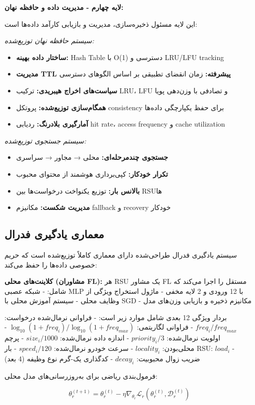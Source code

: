 \documentclass[11pt]{article}
\newcommand{\فصل}[1]{\section{#1}}
\newcommand{\قسمت}[1]{\subsection{#1}}
\begin{document}
\textbf{لایه چهارم - مدیریت داده و حافظه نهان:}

این لایه مسئول ذخیره‌سازی، مدیریت و بازیابی کارآمد داده‌ها است:

\textit{سیستم حافظه نهان توزیع‌شده:}
\begin{itemize}
\item \textbf{ساختار داده بهینه:} Hash Table با O(1) دسترسی و LRU/LFU tracking
\item \textbf{مدیریت TTL پیشرفته:} زمان انقضای تطبیقی بر اساس الگوهای دسترسی
\item \textbf{سیاست‌های اخراج هیبریدی:} ترکیب LRU، LFU و تصادفی با وزن‌دهی پویا
\item \textbf{همگام‌سازی توزیع‌شده:} پروتکل consistency برای حفظ یکپارچگی داده‌ها
\item \textbf{آمارگیری بلادرنگ:} ردیابی hit rate، access frequency و cache utilization
\end{itemize}

\textit{سیستم جستجوی توزیع‌شده:}
\begin{itemize}
\item \textbf{جستجوی چندمرحله‌ای:} محلی → مجاور → سراسری
\item \textbf{تکرار خودکار:} کپی‌برداری هوشمند از محتوای محبوب
\item \textbf{بالانس بار:} توزیع یکنواخت درخواست‌ها بین RSUها
\item \textbf{مدیریت شکست:} مکانیزم fallback و recovery خودکار
\end{itemize}

\قسمت{معماری یادگیری فدرال}

سیستم یادگیری فدرال طراحی‌شده دارای معماری کاملاً توزیع‌شده است که حریم خصوصی داده‌ها را حفظ می‌کند:

\textbf{کلاینت‌های محلی (مشاوران FL):}
هر RSU یک مشاور FL مستقل را اجرا می‌کند که شامل:
- شبکه عصبی MLP با 12 ورودی و 2 لایه مخفی
- ماژول استخراج ویژگی از وظایف محلی
- سیستم آموزش محلی با SGD
- مکانیزم ذخیره و بازیابی وزن‌های مدل

بردار ویژگی 12 بعدی شامل موارد زیر است:
- فراوانی نرمال‌شده درخواست: $freq_i / freq_{max}$
- فراوانی لگاریتمی: $\log_{10}(1 + freq_i) / \log_{10}(1 + freq_{max})$
- اولویت نرمال‌شده: $priority_i / 3$
- اندازه داده نرمال‌شده: $size_i / 1000$
- پرچم محلی‌بودن: $locality_i$
- سرعت خودرو نرمال‌شده: $speed_i / 120$
- بار RSU: $load_i$
- ضریب زوال محبوبیت: $decay_i$
- کدگذاری یک-گرم نوع وظیفه (4 بعد)

فرمول‌بندی ریاضی برای به‌روزرسانی‌های مدل محلی:

\begin{equation}
\theta_r^{(t+1)} = \theta_r^{(t)} - \eta \nabla_{\theta_r} \mathcal{L}_r(\theta_r^{(t)}, \mathcal{D}_r^{(t)})
\end{equation}
\end{document}
